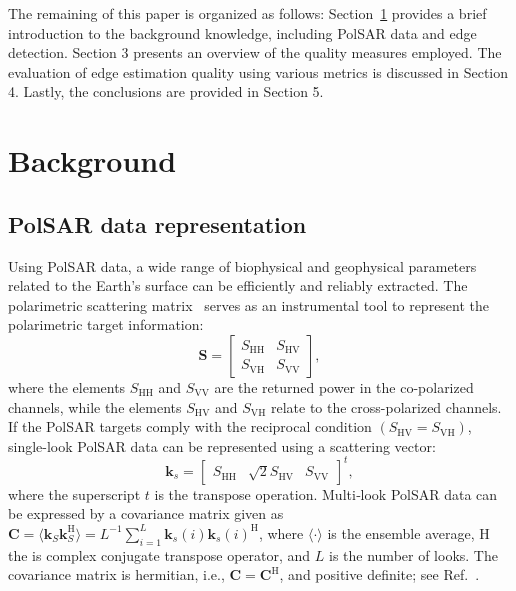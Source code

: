 \documentclass{article}
\begin{document}
The remaining of this paper is organized as follows: 
Section~\ref{sec_2} provides a brief introduction to the background knowledge, including PolSAR data and edge detection. 
Section 3 presents an overview of the quality measures employed. 
The evaluation of edge estimation quality using various metrics is discussed in Section 4. 
Lastly, the conclusions are provided in Section 5.


\section{Background}\label{sec_2}

\subsection{PolSAR data representation}
Using PolSAR data, a wide range of biophysical and geophysical parameters related to the Earth's surface can be efficiently and reliably extracted. The polarimetric scattering matrix~\cite{Lee2017} serves as an instrumental tool to represent the polarimetric target information:
\begin{equation}
 \mathbf{S} = \begin{bmatrix}
S_{\text{HH}} & S_{\text{HV}} \\
S_{\text{VH}} & S_{\text{VV}}
\end{bmatrix},  
\label{E:a1}
\end{equation}
where the elements $S_{\text{HH}}$ and $S_{\text{VV}}$ are the returned power in the co-polarized channels, while the elements $S_{\text{HV}}$ and $S_{\text{VH}}$ relate to the cross-polarized channels.
If the PolSAR targets comply with the reciprocal condition $(S_{\text{HV}} = S_{\text{VH}})$, single-look PolSAR data can be represented using a scattering vector:
\begin{equation}
\mathbf{k}_s=\begin{bmatrix}
S_{\text{HH}} & \sqrt{2}S_{\text{HV}} & S_{\text{VV}}
\end{bmatrix}^t,
\label{E:21}
\end{equation}
where  the superscript $t$ is the transpose operation. 
Multi‑look PolSAR data can be expressed  by a covariance matrix  given as 
\(\mathbf{C}=\langle\mathbf{k}_S\mathbf{k}_S^\text{H} \rangle= {L}^{-1} \sum_{i=1}^{L} \mathbf{k}_s(i)\mathbf{k}_s(i)^\text{H} \), where $\langle \cdot \rangle$ is the ensemble average, $\text{H}$  the is complex conjugate transpose operator, and $L$ is the number of looks. 
The covariance matrix is hermitian, i.e., $\mathbf{C}= \mathbf{C}^\text{H}$, and positive definite;
see Ref.~\cite{Qin2022}.
\end{document}
